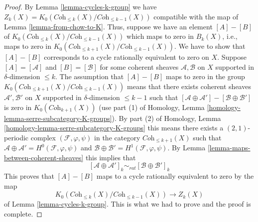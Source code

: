 \documentclass[10pt,a4paper]{amsart}
\theoremstyle{plain}
\theoremstyle{definition}
\theoremstyle{remark}
\numberwithin{equation}{subsection}
\begin{document}
\begin{proof}
By Lemma \ref{lemma-cycles-k-group} we have
$Z_k(X) = K_0(\textit{Coh}_{\leq k}(X)/\textit{Coh}_{\leq k - 1}(X))$
compatible with the map of Lemma \ref{lemma-from-chow-to-K}.
Thus, suppose we have an element $[A] - [B]$ of
$K_0(\textit{Coh}_{\leq k}(X)/\textit{Coh}_{\leq k - 1}(X))$
which maps to zero in $B_k(X)$, i.e., maps to zero in
$K_0(\textit{Coh}_{\leq k + 1}(X)/\textit{Coh}_{\leq k - 1}(X))$.
We have to show that $[A] - [B]$ corresponds to a cycle
rationally equivalent to zero on $X$.
Suppose $[A] = [\mathcal{A}]$ and $[B] = [\mathcal{B}]$
for some coherent sheaves $\mathcal{A}, \mathcal{B}$ on
$X$ supported in $\delta$-dimension $\leq k$.
The assumption that $[A] - [B]$ maps to zero in the group
$K_0(\textit{Coh}_{\leq k + 1}(X)/\textit{Coh}_{\leq k - 1}(X))$
means that there exists coherent sheaves
$\mathcal{A}', \mathcal{B}'$ on $X$ supported in
$\delta$-dimension $\leq k - 1$ such that
$[\mathcal{A} \oplus \mathcal{A}'] - [\mathcal{B} \oplus \mathcal{B}']$
is zero in $K_0(\textit{Coh}_{k + 1}(X))$ (use part (1) of
Homology, Lemma \ref{homology-lemma-serre-subcategory-K-groups}).
By part (2) of
Homology, Lemma \ref{homology-lemma-serre-subcategory-K-groups}
this means there exists a $(2, 1)$-periodic complex
$(\mathcal{F}, \varphi, \psi)$ in the category $\textit{Coh}_{\leq k + 1}(X)$
such that
$\mathcal{A} \oplus \mathcal{A}' = H^0(\mathcal{F}, \varphi, \psi)$
and $\mathcal{B} \oplus \mathcal{B}' = H^1(\mathcal{F}, \varphi, \psi)$.
By Lemma \ref{lemma-maps-between-coherent-sheaves}
this implies that
$$
[\mathcal{A} \oplus \mathcal{A}']_k
\sim_{rat}
[\mathcal{B} \oplus \mathcal{B}']_k
$$
This proves that $[A] - [B]$ maps to a cycle rationally
equivalent to zero by the map
$$
K_0(\textit{Coh}_{\leq k}(X)/\textit{Coh}_{\leq k - 1}(X))
\longrightarrow Z_k(X)
$$
of Lemma \ref{lemma-cycles-k-group}. This is what we
had to prove and the proof is complete.
\end{proof}
\end{document}

